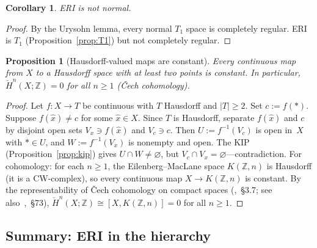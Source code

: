 \documentclass[11pt]{article}
\newtheorem{proposition}[theorem]{Proposition}
\newtheorem{corollary}[theorem]{Corollary}
\theoremstyle{definition}
\theoremstyle{remark}
\begin{document}
\begin{corollary}\label{cor:ERI-notnormal}
ERI is not normal.
\end{corollary}
\begin{proof}
By the Urysohn lemma, every normal $T_1$ space is completely regular.
ERI is $T_1$ (Proposition~\ref{prop:T1}) but not completely regular.
\end{proof}

\begin{proposition}[Hausdorff-valued maps are constant]\label{prop:hausdorff-constant}
Every continuous map from $X$ to a Hausdorff space with at least two
points is constant.
In particular, $\check{H}^n(X;\mathbb{Z}) = 0$ for all $n \geq 1$
\textup{(}\v{C}ech cohomology\textup{)}.
\end{proposition}
\begin{proof}
Let $f\colon X \to T$ be continuous with $T$ Hausdorff and $|T| \geq 2$.
Set $c := f(\ast)$.
Suppose $f(\hat{x}) \neq c$ for some $\hat{x} \in X$.
Since $T$ is Hausdorff, separate $f(\hat{x})$ and $c$ by disjoint
open sets $V_{x} \ni f(\hat{x})$ and $V_c \ni c$.
Then $U := f^{-1}(V_c)$ is open in~$X$ with $\ast \in U$, and
$W := f^{-1}(V_x)$ is nonempty and open.
The KIP (Proposition~\ref{prop:kip}) gives $U \cap W \neq \varnothing$,
but $V_c \cap V_x = \varnothing$---contradiction.
For cohomology: for each $n \geq 1$, the Eilenberg--MacLane space
$K(\mathbb{Z}, n)$ is Hausdorff (it is a CW-complex), so every
continuous map $X \to K(\mathbb{Z}, n)$ is constant.
By the representability of \v{C}ech cohomology on compact spaces
(\cite{bib:engelking},~\S3.7; see also~\cite{bib:munkres},~\S73),
$\check{H}^n(X;\mathbb{Z}) \cong [X, K(\mathbb{Z}, n)] = 0$
for all $n \geq 1$.
\end{proof}

\subsection{Summary: ERI in the hierarchy}
\end{document}
